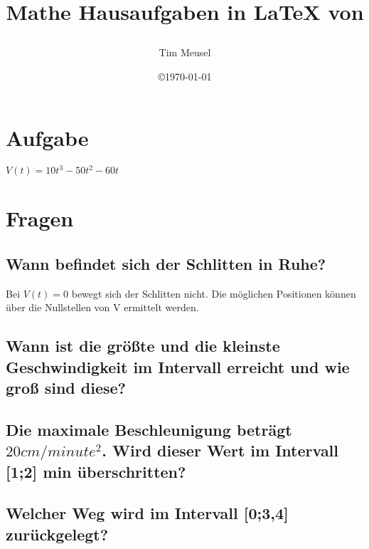 \documentclass[a4paper,11pt]{scrartcl}
\author{Tim Meusel}
\title{Mathe Hausaufgaben in \LaTeX{} von \author{}}
\date{\copyright\today}
\begin{document}
\maketitle

\section{Aufgabe}

$V(t) = 10t^3 - 50t^2 - 60t$

\section{Fragen}

\subsection{Wann befindet sich der Schlitten in Ruhe?}
Bei $V(t) = 0$ bewegt sich der Schlitten nicht. Die möglichen Positionen können
über die Nullstellen von V ermittelt werden.

\subsection{Wann ist die größte und die kleinste Geschwindigkeit im Intervall erreicht und wie groß sind diese?}

\subsection{Die maximale Beschleunigung beträgt $20cm / minute^2$. Wird dieser Wert im Intervall [1;2] min überschritten?
}
\subsection{Welcher Weg wird im Intervall [0;3,4] zurückgelegt?}
\end{document}
